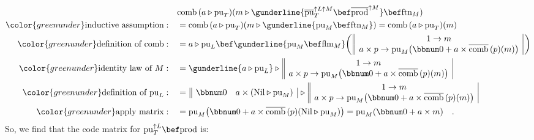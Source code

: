 \begin{align*}
 & \text{comb}\,(a\triangleright\text{pu}_{T})(m\triangleright\gunderline{\overline{\text{pu}}_{T}^{\uparrow L\uparrow M}\bef\overline{\text{prod}}^{\uparrow M}}\bef\text{ftn}_{M})\\
{\color{greenunder}\text{inductive assumption}:}\quad & =\text{comb}\,(a\triangleright\text{pu}_{T})(m\triangleright\gunderline{\text{pu}_{M}\bef\text{ftn}_{M}})=\text{comb}\,(a\triangleright\text{pu}_{T})(m)\\
{\color{greenunder}\text{definition of }\text{comb}:}\quad & =a\triangleright\text{pu}_{L}\bef\gunderline{\text{pu}_{M}\bef\text{flm}_{M}}\bigg(\,\begin{array}{||c|}
1\rightarrow m\\
a\times p\rightarrow\text{pu}_{M}\big(\bbnum 0+a\times\overline{\text{comb}}\,(p)(m)\big)
\end{array}\,\bigg)\\
{\color{greenunder}\text{identity law of }M:}\quad & =\gunderline{a\triangleright\text{pu}_{L}}\triangleright\,\begin{array}{||c|}
1\rightarrow m\\
a\times p\rightarrow\text{pu}_{M}\big(\bbnum 0+a\times\overline{\text{comb}}\,(p)(m)\big)
\end{array}\\
{\color{greenunder}\text{definition of }\text{pu}_{L}:}\quad & =\,\begin{array}{||cc|}
\bbnum 0 & a\times(\text{Nil}\triangleright\text{pu}_{M})\end{array}\,\triangleright\,\begin{array}{||c|}
1\rightarrow m\\
a\times p\rightarrow\text{pu}_{M}\big(\bbnum 0+a\times\overline{\text{comb}}\,(p)(m)\big)
\end{array}\\
{\color{greenunder}\text{apply matrix}:}\quad & =\text{pu}_{M}\big(\bbnum 0+a\times\overline{\text{comb}}\,(p)(\text{Nil}\triangleright\text{pu}_{M})\big)=\text{pu}_{M}(\bbnum 0+a\times m)\quad.
\end{align*}
So, we find that the code matrix for $\text{pu}_{T}^{\uparrow L}\bef\text{prod}$
is:
